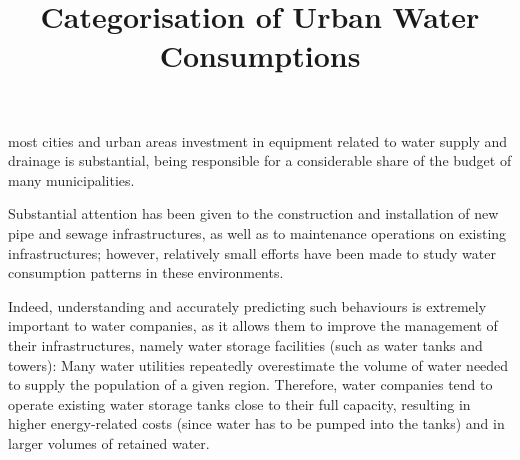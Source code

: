 \documentclass[9pt,journal,compsoc]{IEEEtran}
\begin{document}
\title{\huge Categorisation of Urban Water Consumptions}

\author{
	
}





\maketitle
\IEEEdisplaynontitleabstractindextext
\IEEEpeerreviewmaketitle



 most cities and urban areas investment in equipment related to water supply and drainage is substantial, being responsible for a considerable share of the budget of many municipalities.

Substantial attention has been given to the construction and installation of new pipe and sewage infrastructures, as well as to maintenance operations on existing infrastructures; however, relatively small efforts have been made to study water consumption patterns in these environments.

Indeed, understanding and accurately predicting such behaviours is extremely important to water companies, as it allows them to improve the management of their infrastructures, namely water storage facilities (such as water tanks and towers): Many water utilities repeatedly overestimate the volume of water needed to supply the population of a given region. Therefore, water companies tend to operate existing water storage tanks close to their full capacity, resulting in higher energy-related costs (since water has to be pumped into the tanks) and in larger volumes of retained water. 
\end{document}
